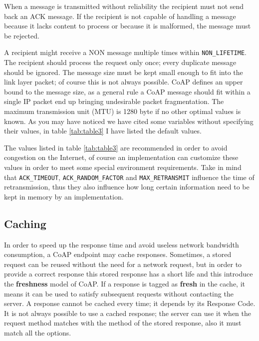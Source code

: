 	When a message is transmitted without reliability the recipient must not send back an ACK message.\newline
	If the recipient is not capable of handling a message because it lacks content to process or because it is malformed, the message must be rejected.\newline
	
	A recipient might receive a NON message multiple times within \texttt{NON\_LIFETIME}.\newline
	The recipient should process the request only once; every duplicate message should be ignored.\newline
	The message size must be kept small enough to fit into the link layer packet; of course this is not always possible.\newline
	CoAP defines an upper bound to the message size, as a general rule a CoAP message should fit within a single IP packet end up bringing undesirable packet fragmentation.\newline
	The maximum transmission unit (MTU) is 1280 byte if no other optimal values is known.\newline
	As you may have noticed we have cited some variables without specifying their values, in table \ref{tab:table3} I have listed the default values.\newline
	
	

	The values listed in table \ref{tab:table3} are recommended in order to avoid congestion on the Internet, of course an implementation can customize these values in order to meet some special environment requirements.\newline
	Take in mind that \texttt{ACK\_TIMEOUT}, \texttt{ACK\_RANDOM\_FACTOR} and \texttt{MAX\_RETRANSMIT} influence the time of retransmission, thus they also influence how long certain information need  to be kept in memory by an implementation.\newline
	
	\subsection{Caching}
	In order to speed up the response time and avoid useless network bandwidth consumption, a CoAP endpoint may cache responses.\newline
	Sometimes, a stored request can be reused without the need for a network request, but in order to provide a correct response this stored response has a short life and this introduce the \textbf{freshness} model of CoAP.\newline
	If a response is tagged as \textbf{fresh} in the cache, it means it can be used to satisfy subsequent requests without contacting the server.\newline
	A response cannot be cached every time; it depends by its Response Code.\newline
	It is not always possible to use a cached response; the server can use it when the request
	method matches with the method of the stored response, also it must match all the options.\newline
	
